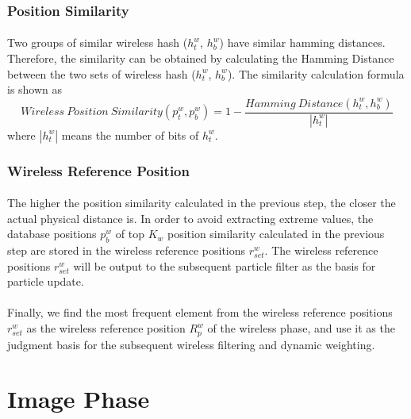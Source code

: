 \documentclass[a4paper,12pt]{report}
\begin{document}
\subsubsection{Position Similarity}
\paragraph{}
Two groups of similar wireless hash ($h_t^{w}$, $h_b^{w}$) have similar hamming distances. Therefore, the similarity can be obtained by calculating the Hamming Distance between the two sets of wireless hash ($h_t^{w}$, $h_b^{w}$). The similarity calculation formula is shown as
\begin{equation}
\label{equation:wireless_position_similarity}
Wireless\ Position\ Similarity(p_t^w, p_b^w) = 1 - \frac{Hamming\ Distance(h_t^w, h_b^{w})}{\left|h_t^w\right|}
\end{equation}
where $\left|h_t^w\right|$ means the number of bits of $h_t^w$.

\subsubsection{Wireless Reference Position}
\paragraph{}
The higher the position similarity calculated in the previous step, the closer the actual physical distance is. In order to avoid extracting extreme values, the database positions $p_b^w$ of top $K_w$ position similarity calculated in the previous step are stored in the wireless reference positions $r_{set}^{w}$. The wireless reference positions $r_{set}^{w}$ will be output to the subsequent particle filter as the basis for particle update.
%

\paragraph{}
Finally, we find the most frequent element from the wireless reference positions $r_{set}^{w}$ as the wireless reference position $R_p^{w}$ of the wireless phase, and use it as the judgment basis for the subsequent wireless filtering and dynamic weighting.
%

\section{Image Phase}
\end{document}
